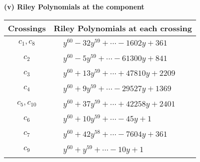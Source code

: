 \documentclass[1p]{elsarticle_modified}
\theoremstyle{definition}
\begin{document}
\newpage\renewcommand{\arraystretch}{1}
\flushleft \textbf{(v) Riley Polynomials at the component}\newline \\
\begin{tabular}{m{50pt}|m{274pt}}
Crossings & \hspace{64pt}Riley Polynomials at each crossing \\
\hline $$\begin{aligned}c_{1},c_{8}\end{aligned}$$&$\begin{aligned}
&y^{60}-32 y^{59}+\cdots-1602 y+361
\end{aligned}$\\
\hline $$\begin{aligned}c_{2}\end{aligned}$$&$\begin{aligned}
&y^{60}-5 y^{59}+\cdots-61300 y+841
\end{aligned}$\\
\hline $$\begin{aligned}c_{3}\end{aligned}$$&$\begin{aligned}
&y^{60}+13 y^{59}+\cdots+47810 y+2209
\end{aligned}$\\
\hline $$\begin{aligned}c_{4}\end{aligned}$$&$\begin{aligned}
&y^{60}+9 y^{59}+\cdots-29527 y+1369
\end{aligned}$\\
\hline $$\begin{aligned}c_{5},c_{10}\end{aligned}$$&$\begin{aligned}
&y^{60}+37 y^{59}+\cdots+42258 y+2401
\end{aligned}$\\
\hline $$\begin{aligned}c_{6}\end{aligned}$$&$\begin{aligned}
&y^{60}+10 y^{59}+\cdots-45 y+1
\end{aligned}$\\
\hline $$\begin{aligned}c_{7}\end{aligned}$$&$\begin{aligned}
&y^{60}+42 y^{58}+\cdots-7604 y+361
\end{aligned}$\\
\hline $$\begin{aligned}c_{9}\end{aligned}$$&$\begin{aligned}
&y^{60}+y^{59}+\cdots-10 y+1
\end{aligned}$\\
\hline
\end{tabular}\\~\\
\end{document}
